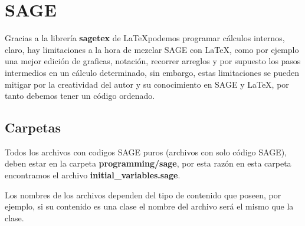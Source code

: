 {	    \section{SAGE}
	    Gracias a la librería \textbf{sagetex} de \LaTeX\space podemos programar cálculos internos, claro, hay limitaciones a la hora de mezclar SAGE con \LaTeX\space, como por ejemplo una mejor edición de graficas, notación, recorrer arreglos y por supuesto los pasos intermedios en un cálculo determinado, sin embargo, estas limitaciones se pueden mitigar por la creatividad del autor y su conocimiento en SAGE y \LaTeX\space, por tanto debemos tener un código ordenado. 
	    \subsection{Carpetas}
	    Todos los archivos con codigos SAGE puros (archivos con solo código SAGE), deben estar en la carpeta \textbf{programming/sage}, por esta razón en esta carpeta encontramos el archivo \textbf{initial\_variables.sage}.
	    \begin{boxbasic}[Nota]
	    	Los nombres de los archivos dependen del tipo de contenido que poseen, por ejemplo, si su contenido es una clase el nombre del archivo será el mismo que la clase.
	    \end{boxbasic}
}
